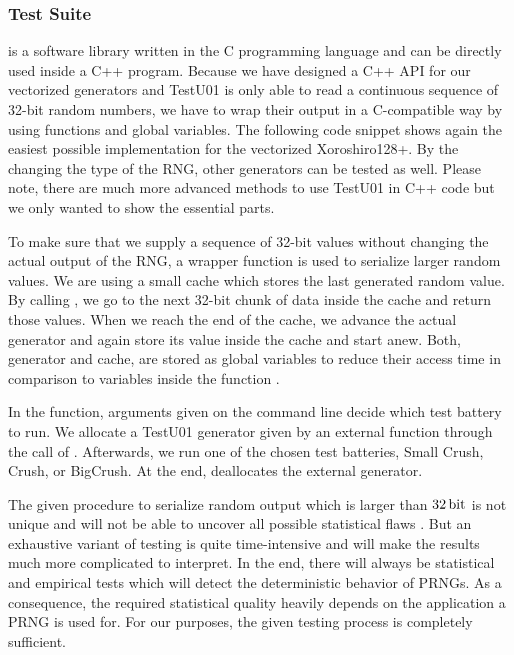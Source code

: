 \documentclass{stdlocal}
\begin{document}
    \subsubsection*{Test Suite }
     is a software library written in the C programming language and can be directly used inside a C++ program.
    Because we have designed a C++ API for our vectorized generators and TestU01 is only able to read a continuous sequence of 32-bit random numbers, we have to wrap their output in a C-compatible way by using functions and global variables.
    The following code snippet shows again the easiest possible implementation for the vectorized Xoroshiro128+.
    By the changing the type of the RNG, other generators can be tested as well.
    Please note, there are much more advanced methods to use TestU01 in C++ code but we only wanted to show the essential parts.

    To make sure that we supply a sequence of 32-bit values without changing the actual output of the RNG, a wrapper function is used to serialize larger random values.
    We are using a small cache which stores the last generated random value.
    By calling , we go to the next 32-bit chunk of data inside the cache and return those values.
    When we reach the end of the cache, we advance the actual generator and again store its value inside the cache and start anew.
    Both, generator and cache, are stored as global variables to reduce their access time in comparison to  variables inside the function .

    In the  function, arguments given on the command line decide which test battery to run.
    We allocate a TestU01 generator given by an external function through the call of .
    Afterwards, we run one of the chosen test batteries, Small Crush, Crush, or BigCrush.
    At the end,  deallocates the external generator.

    The given procedure to serialize random output which is larger than $32\, \mathrm{bit}$ is not unique and will not be able to uncover all possible statistical flaws \autocite{oneill-blog-testu01}.
    But an exhaustive variant of testing is quite time-intensive and will make the results much more complicated to interpret.
    In the end, there will always be statistical and empirical tests which will detect the deterministic behavior of PRNGs.
    As a consequence, the required statistical quality heavily depends on the application a PRNG is used for.
    For our purposes, the given testing process is completely sufficient.
\end{document}
